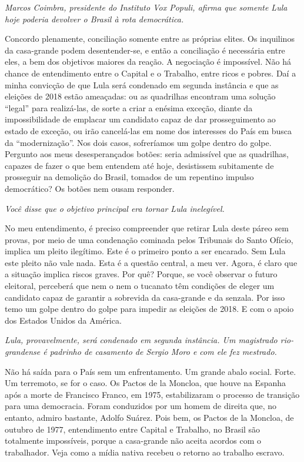 \itshape
Marcos Coimbra, presidente do Instituto Vox Populi,
afirma que somente Lula hoje poderia devolver o Brasil à rota
democrática.

\normalfont 
Concordo plenamente, conciliação somente entre as
próprias elites. Os inquilinos da casa-grande podem desentender-se, e
então a conciliação é necessária entre eles, a bem dos objetivos maiores
da reação. A negociação é impossível. Não há chance de entendimento
entre o Capital e o Trabalho, entre ricos e pobres. Daí a minha
convicção de que Lula será condenado em segunda instância e que as
eleições de 2018 estão ameaçadas: ou as quadrilhas encontram uma solução
``legal'' para realizá-las, de sorte a criar a enésima exceção, diante
da impossibilidade de emplacar um candidato capaz de dar prosseguimento
ao estado de exceção, ou irão cancelá-las em nome dos interesses do País
em busca da ``modernização''. Nos dois casos, sofreríamos um golpe
dentro do golpe. Pergunto aos meus desesperançados botões: seria
admissível que as quadrilhas, capazes de fazer o que bem entendem até
hoje, desistissem subitamente de prosseguir na demolição do Brasil,
tomados de um repentino impulso democrático? Os botões nem ousam
responder.

\itshape
Você disse que o objetivo principal era tornar Lula
inelegível.

\normalfont 
No meu entendimento, é preciso compreender que retirar
Lula deste páreo sem provas, por meio de uma condenação cominada pelos
Tribunais do Santo Ofício, implica um pleito ilegítimo. Este é o
primeiro ponto a ser encarado. Sem Lula este pleito não vale nada. Esta
é a questão central, a meu ver. Agora, é claro que a situação implica
riscos graves. Por quê? Porque, se você observar o futuro eleitoral,
perceberá que nem o  nem o tucanato têm condições de eleger um
candidato capaz de garantir a sobrevida da casa-grande e da senzala. Por
isso temo um golpe dentro do golpe para impedir as eleições de 2018. E
com o apoio dos Estados Unidos da América.

\itshape
Lula, provavelmente, será condenado em segunda
instância. Um magistrado rio-grandense é padrinho de casamento de Sergio
Moro e com ele fez mestrado.

\normalfont 
Não há saída para o País sem um enfrentamento. Um grande
abalo social. Forte. Um terremoto, se for o caso. Os Pactos de la
Moncloa, que houve na Espanha após a morte de Francisco Franco, em 1975,
estabilizaram o processo de transição para uma democracia. Foram
conduzidos por um homem de direita que, no entanto, admiro bastante,
Adolfo Suárez. Pois bem, os Pactos de la Moncloa, de outubro de 1977,
entendimento entre Capital e Trabalho, no Brasil são totalmente
impossíveis, porque a casa-grande não aceita acordos com o trabalhador.
Veja como a mídia nativa recebeu o retorno ao trabalho escravo.

